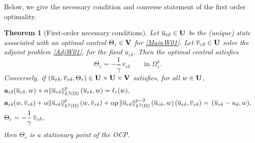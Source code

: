\documentclass[11pt,a4paper]{article}
\numberwithin{equation}{section}
\def\wo{\overline}
\def\e{\varepsilon}
\def\Ga{{\bf a}}
\def\ed{{\varepsilon\delta}}
\def\Ga{{\bf a}}
\def\GU{{\bf U}}
\def\GV{{\bf V}}
\newtheorem{theorem}{Theorem}[section]
\begin{document}
	
	Below, we give the necessary condition and converse statement of the first order optimality.		
		\begin{theorem}[First-order necessary conditions]
			\label{CC01}
			Let $\wo u_\ed\in\GU$ be the (unique) state associated with an optimal control $\Theta_\e\in\GV$ for \eqref{MainW01}.
			Let $\wo v_\ed\in\GU$ solve the adjoint problem \eqref{AdjW01}, for the fixed $\wo u_\ed$. 
			Then the optimal control satisfies
			\begin{equation}\label{OCF01}
				\Theta_\e=-\frac{1}{\gamma}\,\wo v_\ed \qquad \text{in }\Omega^1_\e.
			\end{equation}
			Conversely, if $(\wo u_\ed,\wo v_\ed,\Theta_\e)\in\GU\times\GU\times\GV$ satisfies, for all $w\in\GU$,
			\begin{equation}\label{OS01}
				\begin{aligned}
					&\Ga_\ed(\wo u_\ed,w)+\alpha\|\wo u_\ed\|_{L^2(\Omega)}^{p}\,(\wo u_\ed,w)=\ell_\e(w),\\
					&\Ga_\ed(w,\wo v_\ed)
					+\alpha\|\wo u_\ed\|_{L^2(\Omega)}^{p}\,(w,\wo v_\ed)
					+\alpha p\,\|\wo u_\ed\|_{L^2(\Omega)}^{p-2}\,(\wo u_\ed,w)\,(\wo u_\ed,\wo v_\ed)
					= \,(\wo u_\ed-u_d,w),\\
					&\Theta_\e=-\frac{1}{\gamma}\,\wo v_\ed,
				\end{aligned}
			\end{equation}
			then $\Theta_\e$ is a stationary point of the OCP.
		\end{theorem}
\end{document}
